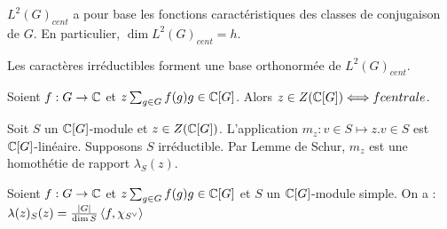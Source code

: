\documentclass{cours}
\begin{document}
\begin{lemma}
    $L^{2}(G)_{cent}$ a pour base les fonctions caractéristiques des classes de conjugaison de $G$. En particulier, $\dim L^{2}(G)_{cent} = h$.
\end{lemma}

\begin{theorem}
    Les caractères irréductibles forment une base orthonormée de $L^{2}(G)_{cent}$.
\end{theorem}

\begin{lemma}
    Soient $f : G \rightarrow \mathbb{C}$ et $z \sum_{g \in G}f(g)g \in \mathbb{C}[G]$. Alors $z \in Z(\mathbb{C}[G]) \Longleftrightarrow f centrale$.
\end{lemma}

\begin{definition}
    Soit $S$ un $\mathbb{C}[G]$-module et $z \in Z(\mathbb{C}[G])$. L'application $m_{z} : v \in S \mapsto z.v \in S$ est $\mathbb{C}[G]$-linéaire. Supposons $S$ irréductible. Par Lemme de Schur, $m_{z}$ est une homothétie de rapport $\lambda_{S}(z)$.
\end{definition}

\begin{lemma}
    Soient $f : G \rightarrow \mathbb{C}$ et $z \sum_{g \in G}f(g)g \in \mathbb{C}[G]$ et $S$ un $\mathbb{C}[G]$-module simple. On a : $\lambda(z)_{S}(z) = \frac{\left|G\right|}{\dim S}\left\langle f, \chi_{S^{\lor}} \right\rangle$
\end{lemma}
\end{document}
